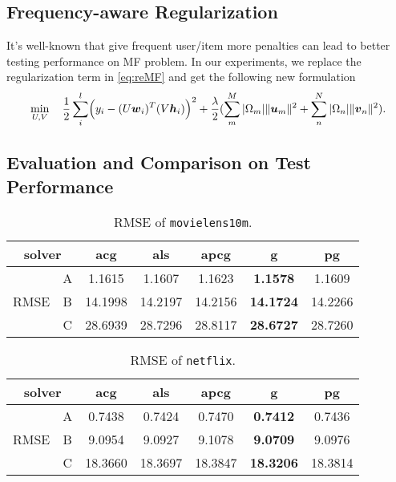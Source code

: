 \documentclass[11pt,twoside]{article}
\newcommand{\bsym}[1]{\ensuremath{\boldsymbol{#1}}}
\newcommand{\bw}{\ensuremath{\bsym{w}}}
\newcommand{\bh}{\ensuremath{\bsym{h}}}
\newcommand{\bu}{\ensuremath{\bsym{u}}}
\newcommand{\bv}{\ensuremath{\bsym{v}}}
\begin{document}
\subsection{Frequency-aware Regularization}
It's well-known that give frequent user/item more penalties can lead to better testing performance on MF problem. In our experiments, we replace the regularization term in \eqref{eq:reMF} and get the following new formulation
\begin{equation}
    \min_{U,V}  \quad \frac{1}{2}\sum_{i}^l  \Bigl(y_i - (U \bw_i)^T (V \bh_i)\Bigr)^2+
    \frac{\lambda}{2} (\sum^{M}_m |\Omega_{m}| \|\bu_m\|^2 +\sum^{N}_{n} |\Omega_{n}| \|\bv_n\|^2).
    \label{eq:faMF}
\end{equation}
\subsection{Evaluation and Comparison on Test Performance}
\begin{table}[H]
\centering
\begin{tabular}{c|c|ccccc}
\multicolumn{2}{c|}{solver} & acg     & als     & apcg    & g                & pg      \\ \hline
\multirow{3}{*}{RMSE}  & A  & 1.1615  & 1.1607  & 1.1623  & \textbf{1.1578}  & 1.1609  \\ \cline{2-7} 
                       & B  & 14.1998 & 14.2197 & 14.2156 & \textbf{14.1724} & 14.2266 \\ \cline{2-7} 
                       & C  & 28.6939 & 28.7296 & 28.8117 & \textbf{28.6727} & 28.7260
\end{tabular}
\caption{RMSE of {\tt movielens10m}.}
    \label{tab:rmse_ml}
\end{table}

\begin{table}[H]
\centering
\begin{tabular}{c|c|ccccc}
\multicolumn{2}{c|}{solver} & acg     & als    & apcg    & g               & pg      \\ \hline
\multirow{3}{*}{RMSE}  & A  & 0.7438  & 0.7424 & 0.7470  & \textbf{0.7412} & 0.7436  \\ \cline{2-7} 
                       & B  & 9.0954  & 9.0927 & 9.1078  & \textbf{9.0709} & 9.0976  \\ \cline{2-7} 
                       & C  & 18.3660 & 18.3697      & 18.3847 & \textbf{18.3206}      & 18.3814
\end{tabular}
\caption{RMSE of {\tt netflix}.}
    \label{tab:rmse_nf}
\end{table}

\clearpage\newpage


%
\end{document}
